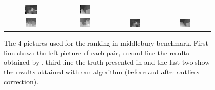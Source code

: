 \documentclass{ipol}
\begin{document}
\begin{figure}[h]
\begin{center}
\begin{tabular}{cccc}
\includegraphics[width=0.245\textwidth]{Images/practical_results/tsukuba.png} &
\includegraphics[width=0.210\textwidth]{Images/practical_results/venus.png}\\
\includegraphics[width=0.220\textwidth]{Images/after_correction/cones.png} &
\includegraphics[width=0.220\textwidth]{Images/after_correction/teddy.png} &
\includegraphics[width=0.245\textwidth]{Images/after_correction/tsukuba.png} &
\includegraphics[width=0.210\textwidth]{Images/after_correction/venus.png}\\
\end{tabular}
	\caption{The 4 pictures used for the ranking in middlebury benchmark. First line shows the left picture of each pair, second line the results obtained by \cite{adCensus}, third line the truth presented in \cite{middleBench} and the last two show the results obtained with our algorithm (before and after outliers correction).}
	\label{middlPics}
\end{center}
\end{figure}
\end{document}
